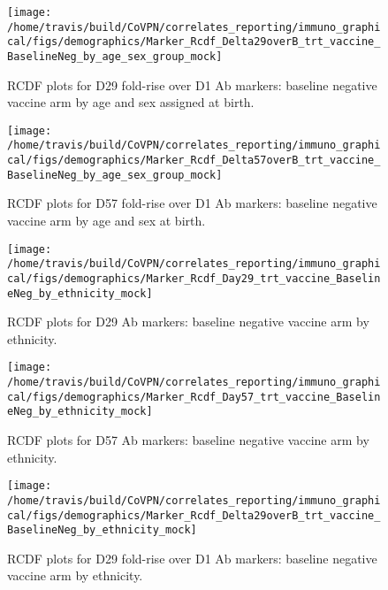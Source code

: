 \documentclass[]{book}
\theoremstyle{definition}
\theoremstyle{definition}
\theoremstyle{definition}
\newcommand{\1}{\mathbbm{1}}
\begin{document}
\clearpage
\begin{figure}[H]

{\centering \texttt{[image: /home/travis/build/CoVPN/correlates\_reporting/immuno\_graphical/figs/demographics/Marker\_Rcdf\_Delta29overB\_trt\_vaccine\_BaselineNeg\_by\_age\_sex\_group\_mock]} 

}

\caption{RCDF plots for D29 fold-rise over D1 Ab markers: baseline negative vaccine arm by age and sex assigned at birth.}\label{fig:unnamed-chunk-73}
\end{figure}

\clearpage
\begin{figure}[H]

{\centering \texttt{[image: /home/travis/build/CoVPN/correlates\_reporting/immuno\_graphical/figs/demographics/Marker\_Rcdf\_Delta57overB\_trt\_vaccine\_BaselineNeg\_by\_age\_sex\_group\_mock]} 

}

\caption{RCDF plots for D57 fold-rise over D1 Ab markers: baseline negative vaccine arm by age and sex at birth.}\label{fig:unnamed-chunk-74}
\end{figure}

\clearpage
\begin{figure}[H]

{\centering \texttt{[image: /home/travis/build/CoVPN/correlates\_reporting/immuno\_graphical/figs/demographics/Marker\_Rcdf\_Day29\_trt\_vaccine\_BaselineNeg\_by\_ethnicity\_mock]} 

}

\caption{RCDF plots for D29 Ab markers: baseline negative vaccine arm by ethnicity.}\label{fig:unnamed-chunk-75}
\end{figure}

\clearpage
\begin{figure}[H]

{\centering \texttt{[image: /home/travis/build/CoVPN/correlates\_reporting/immuno\_graphical/figs/demographics/Marker\_Rcdf\_Day57\_trt\_vaccine\_BaselineNeg\_by\_ethnicity\_mock]} 

}

\caption{RCDF plots for D57 Ab markers: baseline negative vaccine arm by ethnicity.}\label{fig:unnamed-chunk-76}
\end{figure}

\clearpage
\begin{figure}[H]

{\centering \texttt{[image: /home/travis/build/CoVPN/correlates\_reporting/immuno\_graphical/figs/demographics/Marker\_Rcdf\_Delta29overB\_trt\_vaccine\_BaselineNeg\_by\_ethnicity\_mock]} 

}

\caption{RCDF plots for D29 fold-rise over D1 Ab markers: baseline negative vaccine arm by ethnicity.}\label{fig:unnamed-chunk-77}
\end{figure}
\end{document}
